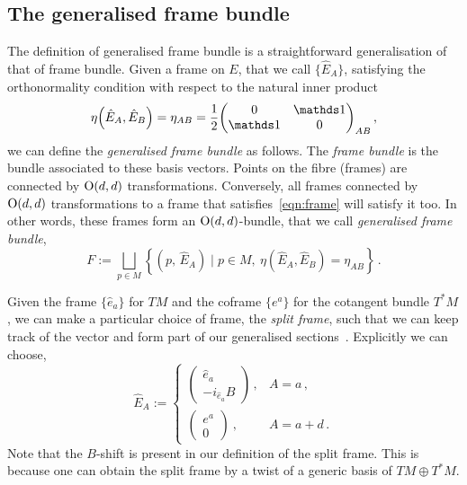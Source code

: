 \documentclass[debug]{phd}
\begin{document}
					\subsection{The generalised frame bundle}\label{genframOdd}
						The definition of generalised frame bundle is a straightforward generalisation of that of frame bundle. 
						Given a frame on $E$, that we call $\{\hat{E}_A\}$, satisfying the orthonormality condition with respect to the natural inner product
								\begin{equation}\label{eqn:frame}
									\eta\left(\hat{E}_A, \hat{E}_B\right) = \eta_{AB} = \frac{1}{2} \begin{pmatrix} 0 & \id \\ 
																					\id & 0 \end{pmatrix}_{AB} \, ,
								\end{equation}
						we can define the \emph{generalised frame bundle} as follows. 
						The \emph{frame bundle} is the bundle associated to these basis vectors. 
						Points on the fibre (frames) are connected by $\mathrm{O}(d,d)$ transformations. 
						Conversely, all frames connected by $\mathrm{O}(d,d)$ transformations to a frame that satisfies~\eqref{eqn:frame} will satisfy it too. 
						In other words, these frames form an $\mathrm{O}(d,d)$-bundle, that we call \emph{generalised frame bundle},
								\begin{equation}\label{genfr}
									F := \bigsqcup_{p\in M} \left\{\left( p,\, \hat{E}_A \right) \mid p \in M,\ \eta\left(\hat{E}_A, \hat{E}_B\right) = \eta_{AB} \right\} \, .
								\end{equation}

						Given the frame $\{\hat{e}_a\}$ for $TM$ and the coframe $\{e^a\}$ for the cotangent bundle $T^*M$, we can make a particular choice of frame, the \emph{split frame}, such that we can keep track of the vector and form part of our generalised sections~\cite{waldram1, waldram3}. 
						Explicitly we can choose,
								\begin{equation}\label{splitframe}
									\hat{E}_A := \begin{cases}
												\begin{pmatrix}\hat{e}_a\\ - i_{\hat{e}_a}B\end{pmatrix} \, , & A = a \, ,\\[3mm]
												\begin{pmatrix} e^a \\ 0 \end{pmatrix} \ , & A = a + d \, . \end{cases}
								\end{equation} 
						Note that the $B$-shift is present in our definition of the split frame. 
						This is because one can obtain the split frame by a twist of a generic basis of $TM \oplus T^*M$.
						
\end{document}
